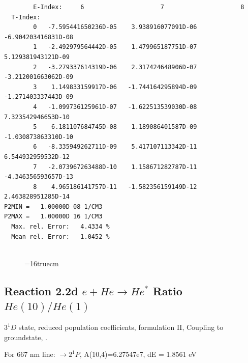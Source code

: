 \documentclass[12pt,dvipdfmx]{article}
\begin{document}
\begin{small}
\begin{verbatim}
        E-Index:     6                     7                     8
  T-Index:
        0   -7.595441650236D-05    3.938916077091D-06   -6.904203416831D-08
        1   -2.492979564442D-05    1.479965187751D-07    5.129381943121D-09
        2   -3.279337614319D-06    2.317424648906D-07   -3.212001663062D-09
        3    1.149833159917D-06   -1.744164295894D-09   -1.271403337443D-09
        4   -1.099736125961D-07   -1.622513539030D-08    7.323542946653D-10
        5    6.181107684745D-08    1.189086401587D-09   -1.030873863310D-10
        6   -8.335949262711D-09    5.417107113342D-11    6.544932959532D-12
        7   -2.073967263488D-10    1.158671282787D-11   -4.346356593657D-13
        8    4.965186141757D-11   -1.582356159149D-12    2.463828951285D-14
P2MIN =   1.00000D 08 1/CM3
P2MAX =   1.00000D 16 1/CM3
  Max. rel. Error:   4.4334 %
  Mean rel. Error:   1.0452 %


\end{verbatim}\end{small}
\begin{figure} \label{2.2c}
\epsfxsize=16truecm
\end{figure}
\newpage


\subsection{
  Reaction 2.2d $e + He \rightarrow He^*  $ Ratio $He(10)/He(1)$
}

  $3^1D$ state,
  reduced population coefficients, formulation II,
  Coupling to groundstate, \cite{kn:Fujimoto}.

  For 667 nm line: $\rightarrow 2^1P$, A(10,4)=6.27547e7, dE = 1.8561 eV
\end{document}
